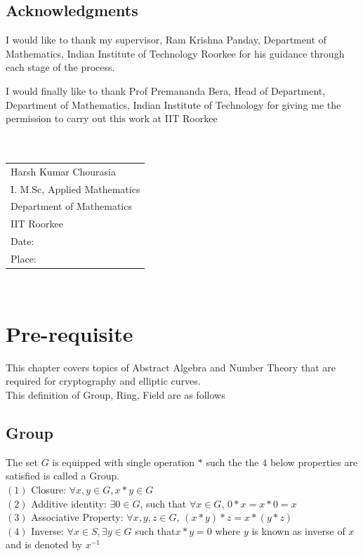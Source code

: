 \documentclass[12pt,a4paper]{report}
\begin{document}
\section*{Acknowledgments}
I would like to thank my supervisor, Ram Krishna Panday, Department
of Mathematics, Indian Institute of Technology Roorkee for his guidance through each stage of the process.

I would finally like to thank Prof Premananda Bera, Head of Department, Department of Mathematics, Indian Institute of Technology for giving me the permission to carry out this work at IIT Roorkee\\\\\\
\begin{tabular}{l}
Harsh Kumar Chourasia\\
I. M.Sc, Applied Mathematics\\
Department of Mathematics\\
IIT Roorkee\\
Date:\\
Place:\\ 
\end{tabular}
 
\cleardoublepage	
	
	
\tableofcontents
\thispagestyle{empty}
\cleardoublepage	
\
\setcounter{page}{1}
	
\chapter{Pre-requisite}
This chapter covers topics of Abstract Algebra and Number Theory that are required for cryptography and elliptic curves.\\
This definition of Group, Ring, Field are as follows
\section{Group}
The set  $G$ is equipped with  single operation $*$ such the the $4$ below properties are satisfied is called a Group.\\
$(1)$ Closure: $\forall x,y \in G, x*y \in G$ \\
$(2)$ Additive identity: $\exists 0 \in G$, such that $ \forall x \in G$, $ 0*x=x*0=x$\\
$(3)$ Associative Property: $ \forall x,y,z \in G$, $(x*y)*z=x*(y*z)$ \\
$(4)$ Inverse: $ \forall x \in S, \exists y \in G$ such that$x*y=0$ where $y$ is known as inverse of $x$ and is denoted by $x^{-1}$
\end{document}
